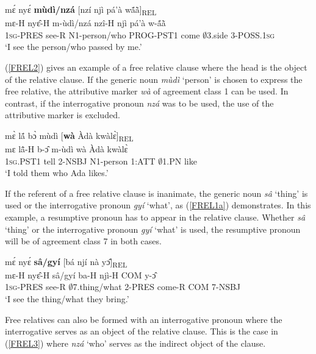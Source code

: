 \begin{exe}
\ex\label{FREL1}
  \glll mɛ́ nyɛ́ {\bfseries mùdì/nzá} [nzí njì pá'à wã́ã̀]\textsubscript{REL}\\
         mɛ-H nyɛ̂-H m-ùdì/nzá nzî-H njì pá'à w-ã́ã̀ \\
         1\textsc{sg}-PRES see-R N1-person/who PROG-PST1 come $\emptyset$3.side 3-POSS.1\textsc{sg}   \\
    \trans `I see the person/who passed by me.'
\end{exe}

(\ref{FREL2}) gives an example of a free relative clause where the head is the object of the relative clause. If the generic noun {\itshape mùdì} `person' is chosen to express the free relative, the attributive marker {\itshape wà} of agreement class 1 can be used. In contrast, if the interrogative pronoun {\itshape nzá} was to be used, the use of the attributive marker is excluded.

\begin{exe}
\ex\label{FREL2}
  \glll mɛ̀ lã́ bɔ̀ mùdì [{\bfseries wà} Àdà kwàlɛ̀]\textsubscript{REL} \\
         mɛ lã̂-H b-ɔ̂ m-ùdì wà Àdà kwàlɛ̀ \\
         1\textsc{sg}.PST1 tell 2-NSBJ N1-person 1:ATT $\emptyset$1.PN like   \\
    \trans `I told them who Ada likes.'
\end{exe}

If the referent of a free relative clause is inanimate, the generic noun {\itshape sâ} `thing' is used or the interrogative pronoun {\itshape gyí} `what', as (\ref{FREL1a}) demonstrates. In this example, a resumptive pronoun has to appear in the relative clause. Whether {\itshape sâ} `thing' or the interrogative pronoun {\itshape gyí} `what' is used, the resumptive pronoun will be of agreement class 7 in both cases. 

\begin{exe}
\ex\label{FREL1a}
  \glll mɛ́ nyɛ́ {\bfseries sâ/gyí} [bá njí nà yɔ̂]\textsubscript{REL}\\
         mɛ-H nyɛ̂-H sâ/gyí ba-H njì-H COM y-ɔ̂\\
         1\textsc{sg}-PRES see-R $\emptyset$7.thing/what 2-PRES come-R COM 7-NSBJ  \\
    \trans `I see the thing/what they bring.'
\end{exe}

Free relatives can also be formed with an interrogative pronoun where the interrogative serves as an object of the relative clause. This is the case in (\ref{FREL3}) where {\itshape nzá} `who' serves as the indirect object of the clause.

